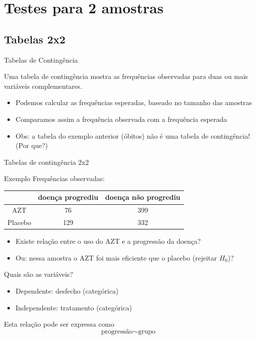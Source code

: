 \documentclass{beamer}
\begin{document}
\section[2 amostras]{Testes para 2 amostras}

\subsection{Tabelas 2x2}

\begin{frame}{Tabelas de Contingência}
  \begin{definition}
    Uma \alert{tabela de contingência} mostra as frequências
    observadas para duas ou mais variáveis complementares.
  \end{definition}
  \begin{itemize}
  \item Podemos calcular as frequências esperadas, baseado no tamanho
    das amostras
  \item Comparamos assim a frequência observada com a frequência
    esperada
  \item Obs: a tabela do exemplo anterior (óbitos) \alert{não é} uma
    tabela de contingência! (Por que?)
  \end{itemize}
\end{frame}

\begin{frame}{Tabelas de contingência 2x2}
  \begin{exampleblock}{Exemplo}
    Frequências observadas:
    \begin{tabular}{c|c|c}
      & doença progrediu & doença não progrediu\\
      \hline
      AZT & 76 & 399 \\
      \hline
      Placebo & 129 & 332 \\
    \end{tabular}
  \end{exampleblock}
  \begin{itemize}
  \item Existe relação entre o uso do AZT e a progressão da doença?
  \item Ou: nessa amostra o AZT foi mais eficiente que o placebo
    (rejeitar $H_0$)?
  \end{itemize}
\end{frame}

\begin{frame}{Quais são as variáveis?}
  \begin{itemize}
    \small
  \item Dependente: desfecho (categórica)
  \item Independente: tratamento (categórica)
  \end{itemize}
  \vfill
  \begin{block}{Esta relação pode ser expressa como}
    \begin{displaymath}
      \text{progressão} \sim \text{grupo}
    \end{displaymath}
  \end{block}
\end{frame}
\end{document}
